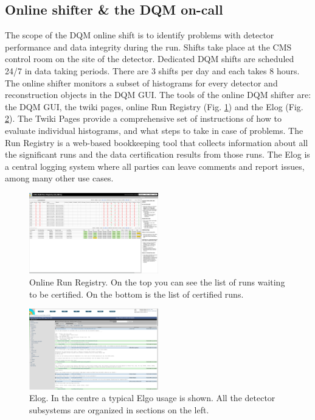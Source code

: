 \documentclass[journal]{IEEEtran}
\begin{document}
\subsection{Online shifter \& the DQM on-call}
The scope of the DQM online shift is to identify problems with detector performance and data integrity during the run. Shifts take place at the CMS control room on the site of the detector. Dedicated DQM shifts are scheduled 24/7 in data taking periods. There are 3 shifts per day and each takes 8 hours. The online shifter monitors a subset of histograms for every detector and reconstruction objects in the DQM GUI. The tools of the online DQM shifter are: the DQM GUI, the twiki pages, online Run Registry (Fig. \ref{OnlineRunRegistry}) and the Elog (Fig. \ref{Elog}). The Twiki Pages provide a comprehensive set of instructions of how to evaluate individual histograms, and what steps to take in case of problems. The Run Registry is a web-based bookkeeping tool that collects information about all the significant runs and the data certification results from those runs. The Elog is a central logging system where all parties can leave comments and report issues, among many other use cases.

\begin{figure}
\includegraphics[width=0.5\textwidth, keepaspectratio=true]{OnlineRunRegistry.png}
\caption{Online Run Registry. On the top you can see the list of runs waiting to be certified. On the bottom is the list of certified runs.}
\label{OnlineRunRegistry}
\end{figure}

\begin{figure}
\includegraphics[width=0.5\textwidth, keepaspectratio=true]{Elog.png}
\caption{Elog. In the centre a typical Elgo usage is shown. All the detector subsystems are organized in sections on the left.}
\label{Elog}
\end{figure}
\end{document}
